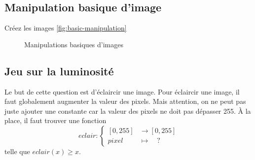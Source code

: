 \subsection*{Manipulation basique d'image}

\ques Créez les images \autoref{fig:basic-manipulation}

\begin{figure}[!h]
    \begin{center}
    \end{center}
    \caption{Manipulations basiques d'images}
    \label{fig:basic-manipulation}
\end{figure}

\subsection*{Jeu sur la luminosité}

Le but de cette question est d'éclaircir une image. Pour éclaircir une image, il faut globalement augmenter la valeur des pixels. Mais attention, on ne peut pas juste ajouter une constante car la valeur des pixels ne doit pas dépasser 255. À la place, il faut trouver une fonction \[
    eclair:
    \begin{cases}
        [0, 255] &\rightarrow [0, 255]\\
        pixel &\mapsto \quad ?
    \end{cases}
\]
telle que $ eclair(x) \geq x $.

